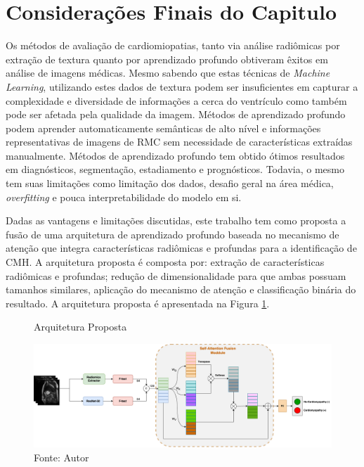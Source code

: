\section{Considerações Finais do Capitulo}
\label{sec:consideracoes_finais}

Os métodos de avaliação de cardiomiopatias, tanto via análise radiômicas por extração de textura quanto por aprendizado profundo obtiveram êxitos em análise de imagens médicas. Mesmo sabendo que estas técnicas de \textit{Machine Learning}, utilizando estes dados de textura podem ser insuficientes em capturar a complexidade e diversidade de informações a cerca do ventrículo como também pode ser afetada pela qualidade da imagem. Métodos de aprendizado profundo podem aprender automaticamente semânticas de alto nível e informações representativas de imagens de \gls{RMC} sem necessidade de características extraídas manualmente.
Métodos de aprendizado profundo tem obtido ótimos resultados em diagnósticos, segmentação, estadiamento e prognósticos. Todavia, o mesmo tem suas limitações como limitação dos dados, desafio geral na área médica, \textit{overfitting} e pouca interpretabilidade do modelo em si.

Dadas as vantagens e limitações discutidas, este trabalho tem como proposta a fusão de uma arquitetura de aprendizado profundo baseada no mecanismo de atenção que integra características radiômicas e profundas para a identificação de \gls{CMH}. A arquitetura proposta é composta por: extração de características radiômicas e profundas; redução de dimensionalidade para que ambas possuam tamanhos similares, aplicação do mecanismo de atenção e classificação binária do resultado. A arquitetura proposta é apresentada na Figura \ref{fig:fig011-01}.

\begin{figure}[htbp]
    \centering
    \caption{Arquitetura Proposta}
    \includegraphics[width=1\textwidth]{figures/fig011.png}
    \caption*{Fonte: Autor}
    \label{fig:fig011-01}
\end{figure}
